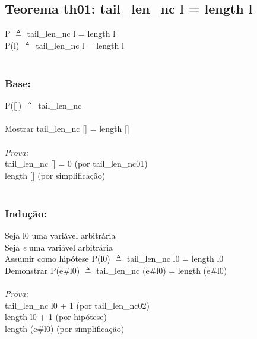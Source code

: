 \documentclass{article}
\begin{document}
\subsection{Teorema th01: tail\_len\_nc l = length l}
P $\triangleq$ tail\_len\_nc l = length l
\\P(l) $\triangleq$ tail\_len\_nc l = length l
\\
\\\subsubsection{Base:} P([]) $\triangleq$ tail\_len\_nc
\\
\\Mostrar tail\_len\_nc [] = length []
\\
\\\textit{Prova:}
\\tail\_len\_nc [] = 0 (por tail\_len\_nc01)
\\length [] (por simplificação)
\\
\\\subsubsection{Indução:}
Seja l0 uma variável arbitrária
\\Seja \textit{e} uma variável arbitrária
\\Assumir como hipótese P(l0) $\triangleq$ tail\_len\_nc l0 = length l0
\\Demonstrar P(e\#l0) $\triangleq$ tail\_len\_nc (e\#l0) = length (e\#l0)
\\
\\\textit{Prova:}
\\tail\_len\_nc l0 + 1 (por tail\_len\_nc02)
\\length l0 + 1 (por hipótese)
\\length (e\#l0) (por simplificação)
\end{document}
